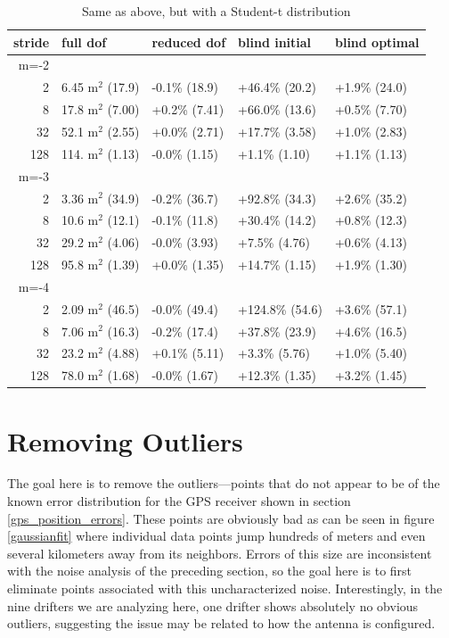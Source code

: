 \documentclass[10pt,journal]{IEEEtran}
\begin{document}
\begin{table}[ht]
\caption{Same as above, but with a Student-t distribution }
\label{fit_results}
\centering
\begin{tabular}{r | llll} stride & full dof & reduced dof & blind initial & blind optimal \\ \hline \hline 
m=-2 &&&&  \\ \hline 
2 & 6.45 m$^2$ (17.9) &  -0.1\% (18.9) &  +46.4\% (20.2) &  +1.9\% (24.0) \\ 
8 & 17.8 m$^2$ (7.00) &  +0.2\% (7.41) &  +66.0\% (13.6) &  +0.5\% (7.70) \\ 
32 & 52.1 m$^2$ (2.55) &  +0.0\% (2.71) &  +17.7\% (3.58) &  +1.0\% (2.83) \\ 
128 & 114. m$^2$ (1.13) &  -0.0\% (1.15) &  +1.1\% (1.10) &  +1.1\% (1.13) \\ 
m=-3 &&&&  \\ \hline 
2 & 3.36 m$^2$ (34.9) &  -0.2\% (36.7) &  +92.8\% (34.3) &  +2.6\% (35.2) \\ 
8 & 10.6 m$^2$ (12.1) &  -0.1\% (11.8) &  +30.4\% (14.2) &  +0.8\% (12.3) \\ 
32 & 29.2 m$^2$ (4.06) &  -0.0\% (3.93) &  +7.5\% (4.76) &  +0.6\% (4.13) \\ 
128 & 95.8 m$^2$ (1.39) &  +0.0\% (1.35) &  +14.7\% (1.15) &  +1.9\% (1.30) \\ 
m=-4 &&&&  \\ \hline 
2 & 2.09 m$^2$ (46.5) &  -0.0\% (49.4) &  +124.8\% (54.6) &  +3.6\% (57.1) \\ 
8 & 7.06 m$^2$ (16.3) &  -0.2\% (17.4) &  +37.8\% (23.9) &  +4.6\% (16.5) \\ 
32 & 23.2 m$^2$ (4.88) &  +0.1\% (5.11) &  +3.3\% (5.76) &  +1.0\% (5.40) \\ 
128 & 78.0 m$^2$ (1.68) &  -0.0\% (1.67) &  +12.3\% (1.35) &  +3.2\% (1.45) \\ 
\end{tabular} 

\end{table}

\section{Removing Outliers}
\label{sec:outliers}

The goal here is to remove the outliers---points that do not appear to be of the known error distribution for the GPS receiver shown in section \ref{gps_position_errors}. These points are obviously bad as can be seen in figure \ref{gaussianfit} where individual data points jump hundreds of meters and even several kilometers away from its neighbors. Errors of this size are inconsistent with the noise analysis of the preceding section, so the goal here is to first eliminate points associated with this uncharacterized noise. Interestingly, in the nine drifters we are analyzing here, one drifter shows absolutely no obvious outliers, suggesting the issue may be related to how the antenna is configured.
\end{document}

